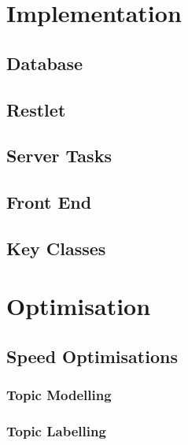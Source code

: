 \documentclass[12pt]{article}
\begin{document}

\newpage

\section{Implementation}

\subsection{Database}


\subsection{Restlet}

\subsection{Server Tasks}

\subsection{Front End}

\subsection{Key Classes}



\newpage

\section{Optimisation}

\subsection{Speed Optimisations}

\subsubsection{Topic Modelling}

\subsubsection{Topic Labelling}
\end{document}
